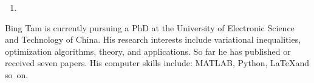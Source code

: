 \documentclass[12pt,a4paper,normalphoto]{LFCV}
\begin{document}



\makecvheader


\divider


\begin{enumerate}
\item[] \vspace{-0.8cm}
\end{enumerate}
Bing Tam is currently pursuing a PhD at the University of Electronic Science and Technology of China. His research interests include variational inequalities, optimization algorithms, theory, and applications. So far he has published or received seven papers. His computer skills include: MATLAB, Python, \LaTeX  and so~on.
 


%

%

%

%

%



%
\end{document}
